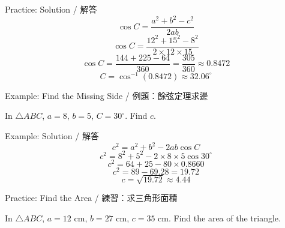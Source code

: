 \documentclass[aspectratio=169]{beamer}
\begin{document}
\begin{frame}{Practice: Solution / 解答}
    \footnotesize
    \[
        \cos C = \frac{a^2 + b^2 - c^2}{2ab}
    \]
    \[
        \cos C = \frac{12^2 + 15^2 - 8^2}{2 \times 12 \times 15}
    \]
    \[
        \cos C = \frac{144 + 225 - 64}{360} = \frac{305}{360} \approx 0.8472
    \]
    \[
        C = \cos^{-1}(0.8472) \approx 32.06^\circ
    \]
\end{frame}


\begin{frame}{Example: Find the Missing Side / 例題：餘弦定理求邊}
    \begin{tcolorbox}[colback=lightgray,colframe=primary,title=Question]
        In $\triangle ABC$, $a=8$, $b=5$, $C=30^\circ$. Find $c$.
    \end{tcolorbox}
    \vspace{0.5em}
    \begin{center}
    \end{center}
\end{frame}

\begin{frame}{Example: Solution / 解答}
    \footnotesize
    \[
        c^2 = a^2 + b^2 - 2ab\cos C
    \]
    \[
        c^2 = 8^2 + 5^2 - 2 \times 8 \times 5 \cos 30^\circ
    \]
    \[
        c^2 = 64 + 25 - 80 \times 0.8660
    \]
    \[
        c^2 = 89 - 69.28 = 19.72
    \]
    \[
        c = \sqrt{19.72} \approx 4.44
    \]
\end{frame}


\begin{frame}{Practice: Find the Area / 練習：求三角形面積}
    \begin{tcolorbox}[colback=lightgray,colframe=accent,title=Practice]
        In $\triangle ABC$, $a=12$ cm, $b=27$ cm, $c=35$ cm. Find the area of the triangle.
    \end{tcolorbox}
    \vspace{0.5em}
    \begin{center}
    \end{center}
\end{frame}
\end{document}
